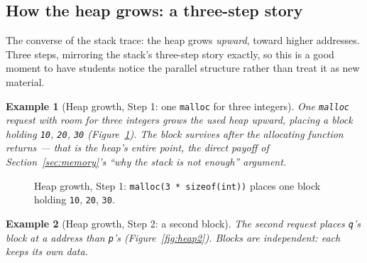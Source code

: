 \documentclass[11pt]{article}
\newtheorem{example}{Example}[section]
\begin{document}
\subsection{How the heap grows: a three-step story}
\label{sec:heap-growth}

The converse of the stack trace: the heap grows \emph{upward}, toward higher addresses. Three steps, mirroring the stack's three-step story exactly, so this is a good moment to have students notice the parallel structure rather than treat it as new material.

\begin{example}[Heap growth, Step 1: one \texttt{malloc} for three integers]
One \texttt{malloc} request with room for three integers grows the used heap upward, placing a block holding \texttt{10}, \texttt{20}, \texttt{30} (Figure~\ref{fig:heap1}). The block survives after the allocating function returns --- that is the heap's entire point, the direct payoff of Section~\ref{sec:memory}'s ``why the stack is not enough'' argument.
\end{example}

\begin{figure}[h]
  \centering
  \caption{Heap growth, Step 1: \texttt{malloc(3 * sizeof(int))} places one
  block holding \texttt{10}, \texttt{20}, \texttt{30}.}
  \label{fig:heap1}
\end{figure}

\begin{example}[Heap growth, Step 2: a second block]
The second request places \texttt{q}'s block at a  address than \texttt{p}'s (Figure~\ref{fig:heap2}). Blocks are independent: each keeps its own data.
\end{example}
\end{document}
